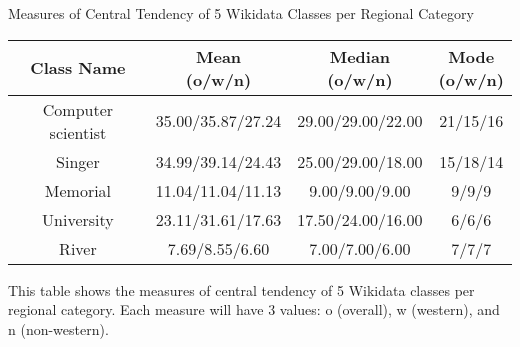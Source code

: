 \begin{center}
\scriptsize
\begin{threeparttable}
\captionsetup{font=small}
\caption{Measures of Central Tendency of 5 Wikidata Classes per Regional Category}
\label{tab:western - central tendency}
\begin{tabular}{c | c c c} 
\toprule
    Class Name & \CellWithForceBreak{Mean \\ (o/w/n)} & \CellWithForceBreak{Median \\ (o/w/n)} & \CellWithForceBreak{Mode \\ (o/w/n)} \\ [0.5ex] 
\midrule
    Computer scientist & 35.00/35.87/27.24 & 29.00/29.00/22.00 & 21/15/16 \\
    Singer & 34.99/39.14/24.43 & 25.00/29.00/18.00 & 15/18/14 \\
    Memorial & 11.04/11.04/11.13 & 9.00/9.00/9.00 & 9/9/9 \\
    University & 23.11/31.61/17.63 & 17.50/24.00/16.00 & 6/6/6 \\
    River & 7.69/8.55/6.60 & 7.00/7.00/6.00 & 7/7/7 \\
    [1ex]
\bottomrule
\end{tabular}
\begin{tablenotes}
    \scriptsize
    \item{This table shows the measures of central tendency of 5 Wikidata classes per regional category. Each measure will have 3 values: o (overall), w (western), and n (non-western).}
\end{tablenotes}
\end{threeparttable}
\end{center}

